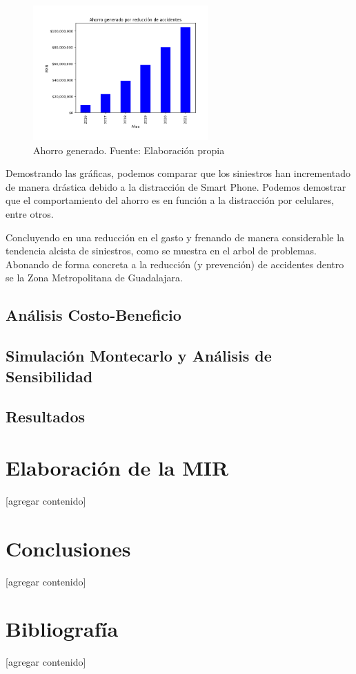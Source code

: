 \documentclass{article}
\begin{document}
	\begin{figure}[H]\centering
	\includegraphics[width=0.6\textwidth]{resources/img/accident_savings.png}
	\caption{\label{fig:accident_savings} Ahorro generado. Fuente: Elaboración propia}
    \end{figure}


 Demostrando las gráficas, podemos comparar que los siniestros han incrementado de manera drástica debido a la distracción de Smart Phone. Podemos demostrar que el comportamiento del ahorro es en función a la distracción por celulares, entre otros. 
 
Concluyendo en una reducción en el gasto y frenando de manera considerable la tendencia alcista de siniestros, como se muestra en el arbol de problemas. Abonando de forma concreta a la reducción (y prevención) de accidentes dentro se la Zona Metropolitana de Guadalajara. 


\subsection{Análisis Costo-Beneficio}
% 
% 

\subsection{Simulación Montecarlo y Análisis de Sensibilidad}

\subsection{Resultados}
% 
% 

\newpage
\section{Elaboración de la MIR}\label{sec:mir}
[agregar contenido]

\newpage
\section{Conclusiones}\label{sec:conclutions}
[agregar contenido]

\newpage
\section{Bibliografía}\label{sec:references}
[agregar contenido]
\end{document}
